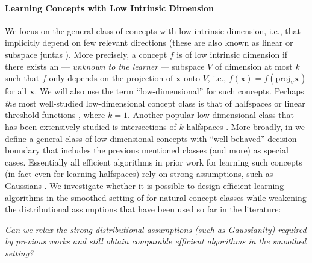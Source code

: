 \documentclass{theoretics}
\renewcommand\vec[1]{\mathbf{#1}}
\newcommand{\proj}{\mathrm{proj}}
\newcommand{\eps}{\epsilon}
\newcommand{\poly}{\mathrm{poly}}
\newcommand{\1}{\Ind}
\newcommand{\x}{\vec x}
\begin{document}
\paragraph{Learning Concepts with Low Intrinsic Dimension}
We focus on the general class of concepts with low intrinsic dimension, i.e., that implicitly
depend on few relevant directions (these are also known as linear or subspace juntas \cite{vempala2011structure,de2019your,DeMN21}).
More precisely, a concept $f$ is of low intrinsic dimension if there exists
an --- \emph{unknown to the learner} --- subspace $V$ of dimension at most $k$ such that 
$f$ only depends on the projection of $\x$ onto $V$, i.e., $f(\x) = f(\proj_{V} \vec \x)$
for all $\x$. We will also use the term ``low-dimensional'' for such concepts.
Perhaps \emph{the} most well-studied low-dimensional concept
class is that of halfspaces or linear threshold functions \cite{Rosenblatt:62,MinskyPapert:88},
where $k=1$.
Another popular low-dimensional class that has been extensively studied is intersections of $k$ halfspaces \cite{DBLP:journals/jcss/BlumK97,ArriagaVempala:99,DBLP:journals/jcss/KlivansS08,KOS:08,Vempala10}.
More broadly, in  we define a general class
of low dimensional concepts with ``well-behaved'' decision boundary that includes the previous mentioned classes (and more) 
as special cases.  Essentially all efficient algorithms in prior work for learning such concepts (in fact even for learning halfspaces) rely on strong assumptions, such as Gaussians \citep{KKMS:05,KOS:08}.
We investigate whether it is possible to design efficient learning 
algorithms in the smoothed setting of  for 
natural concept classes while weakening the distributional assumptions that have been used so
far in the literature:
\begin{center}
\emph{
Can we relax the strong distributional assumptions (such as Gaussianity) required by previous works and still obtain comparable efficient algorithms in the smoothed setting?}
\end{center}
\end{document}
